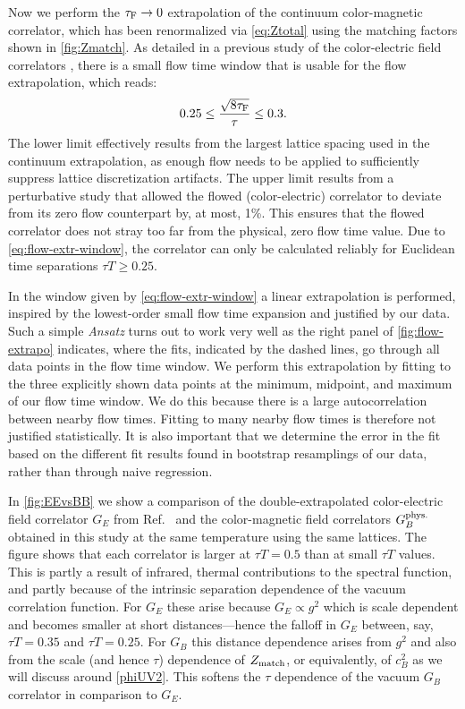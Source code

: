 \documentclass[floatfix,twocolumn,prd,showpacs,preprintnumbers,amsmath,nofootinbib,amssymb,superscriptaddress]{revtex4-2}
\def\ccite#1{Ref.~\cite{#1}} %
\begin{document}
Now we perform the $\tau_\mathrm{F}\rightarrow 0$ extrapolation of the continuum color-magnetic correlator, which has been renormalized via \cref{eq:Ztotal} using the matching factors shown in \cref{fig:Zmatch}.
As detailed in a previous study of the color-electric field correlators \cite{Altenkort:2020fgs, Altenkort:2023oms}, there is a small flow time window that is usable for the flow extrapolation, which reads:
\begin{align}
0.25 \leq \frac{\sqrt{8\tau_\mathrm{F}}}{\tau} \leq 0.3.
\label{eq:flow-extr-window}
\end{align}
The lower limit effectively results from the largest lattice spacing used in the continuum extrapolation, as enough flow needs to be applied to sufficiently suppress lattice discretization artifacts. The upper limit results from a perturbative study \cite{Eller:2018yje} that allowed the flowed (color-electric) correlator to deviate from its zero flow counterpart by, at most, 1\%. This ensures that the flowed correlator does not stray too far from the physical, zero flow time value. Due to \cref{eq:flow-extr-window}, the correlator can only be calculated reliably for Euclidean time separations $\tau T \geq 0.25$.

In the window given by \cref{eq:flow-extr-window} a linear extrapolation is performed, inspired by the lowest-order small flow time expansion and justified by our data.
Such a simple \textit{Ansatz} turns out to work very well as the right panel of \cref{fig:flow-extrapo} indicates, where the fits, indicated by the dashed lines, go through all data points in the flow time window.
We perform this extrapolation by fitting to the three explicitly shown data points at the minimum, midpoint, and maximum of our flow time window.
We do this because there is a large autocorrelation between nearby flow times.
Fitting to many nearby flow times is therefore not justified statistically.
It is also important that we determine the error in the fit based on the different fit results found in bootstrap resamplings of our data, rather than through naive regression.


In \cref{fig:EEvsBB} we show a comparison of the double-extrapolated color-electric field correlator $G_E$ from \ccite{Altenkort:2020fgs} and the color-magnetic field correlators $G_B^{\text{phys.}}$ obtained in this study at the same temperature using the same lattices.
The figure shows that each correlator is larger at $\tau T = 0.5$ than at small $\tau T$ values.
This is partly a result of infrared, thermal contributions to the spectral function, and partly because of the intrinsic separation dependence of the vacuum correlation function.
For $G_E$ these arise because $G_E \propto g^2$ which is scale dependent and becomes smaller at short distances---hence the falloff in $G_E$ between, say, $\tau T = 0.35$ and $\tau T = 0.25$.
For $G_B$ this distance dependence arises from $g^2$ and also from the scale (and hence $\tau$) dependence of $Z_{\mathrm{match}}$, or equivalently, of $c_B^2$ as we will discuss around \cref{phiUV2}.
This softens the $\tau$ dependence of the vacuum $G_B$ correlator in comparison to $G_E$.
\end{document}
